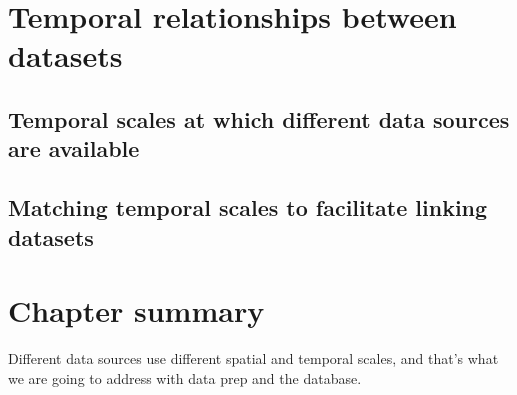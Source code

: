 \section{Temporal relationships between datasets} \label{sec:termporal_relationships_between_datasets}

\subsection{Temporal scales at which different data sources are available} \label{subsec:temporal_scales}

\subsection{Matching temporal scales to facilitate linking datasets} \label{subsec:matching_temporal_scales}

\section{Chapter summary} \label{sec:data_sources_summary}
Different data sources use different spatial and temporal scales, and that's what we are going to address with data prep and the database.
